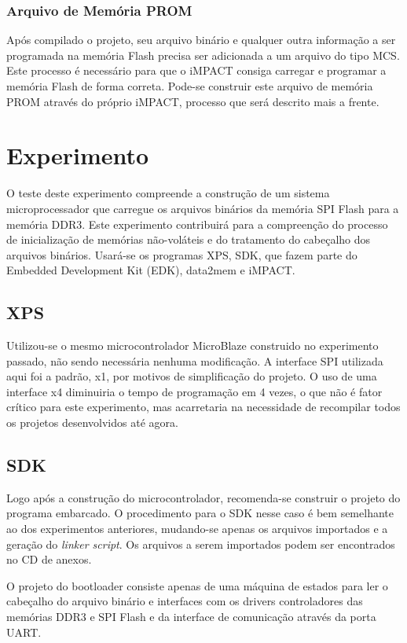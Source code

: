 \documentclass[11pt,a4paper,oneside]{book}
\begin{document}
\subsubsection{Arquivo de Memória PROM}
Após compilado o projeto, seu arquivo binário e qualquer outra informação a ser programada na memória Flash precisa ser adicionada a um arquivo do tipo MCS.
Este processo é necessário para que o iMPACT consiga carregar e programar a memória Flash de forma correta.
Pode-se construir este arquivo de memória PROM através do próprio iMPACT, processo que será descrito mais a frente.

\section{Experimento}
O teste deste experimento compreende a construção de um sistema microprocessador que carregue os arquivos binários da memória SPI Flash para a memória DDR3.
Este experimento contribuirá para a compreenção do processo de inicialização de memórias não-voláteis e do tratamento do cabeçalho dos arquivos binários.
Usará-se os programas XPS, SDK, que fazem parte do Embedded Development Kit (EDK), data2mem e iMPACT.

\subsection{XPS}
Utilizou-se o mesmo microcontrolador MicroBlaze construido no experimento passado, não sendo necessária nenhuma modificação.
A interface SPI utilizada aqui foi a padrão, x1, por motivos de simplificação do projeto.
O uso de uma interface x4 diminuiria o tempo de programação em 4 vezes, o que não é fator crítico para este experimento, mas acarretaria na necessidade de recompilar todos os projetos desenvolvidos até agora.

\subsection{SDK}
Logo após a construção do microcontrolador, recomenda-se construir o projeto do programa embarcado.
O procedimento para o SDK nesse caso é bem semelhante ao dos experimentos anteriores, mudando-se apenas os arquivos importados e a geração do \textit{linker script}.
Os arquivos a serem importados podem ser encontrados no CD de anexos.

O projeto do bootloader consiste apenas de uma máquina de estados para ler o cabeçalho do arquivo binário e interfaces com os drivers controladores das memórias DDR3 e SPI Flash e da interface de comunicação através da porta UART.
\end{document}
